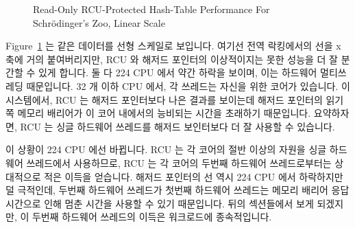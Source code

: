 \fi

\begin{figure}[tb]
\centering
{}
\caption{Read-Only RCU-Protected Hash-Table Performance For Schr\"odinger's Zoo, Linear Scale}
\label{fig:datastruct:Read-Only RCU-Protected Hash-Table Performance For Schroedinger's Zoo, Linear Scale}
\end{figure}

Figure~\ref{fig:datastruct:Read-Only RCU-Protected Hash-Table Performance For Schroedinger's Zoo, Linear Scale}
는 같은 데이터를 선형 스케일로 보입니다.
여기선 전역 락킹에서의 선을 x 축에 거의 붙여버리지만, RCU 와 해저드 포인터의
이상적이지는 못한 성능을 더 잘 분간할 수 있게 합니다.
둘 다 224 CPU 에서 약간 하락을 보이며, 이는 하드웨어 멀티쓰레딩 때문입니다.
32 개 이하 CPU 에서, 각 쓰레드는 자신을 위한 코어가 있습니다.
이 시스템에서, RCU 는 해저드 포인터보다 나은 결과를 보이는데 해저드 포인터의
읽기 쪽 메모리 배리어가 이 코어 내에서의 능비되는 시간을 초래하기 때문입니다.
요약하자면, RCU 는 싱글 하드웨어 쓰레드를 해저드 보인터보다 더 잘 사용할 수
있습니다.

이 상황이 224 CPU 에선 바뀝니다.
RCU 는 각 코어의 절반 이상의 자원을 싱글 하드웨어 쓰레드에서 사용하므로, RCU 는
각 코어의 두번째 하드웨어 쓰레드로부터는 상대적으로 적은 이득을 얻습니다.
해저드 포인터의 선 역시 224 CPU 에서 하락하지만 덜 극적인데, 두번째 하드웨어
쓰레드가 첫번째 하드웨어 쓰레드는 메모리 배리어 응답시간으로 인해 멈춘 시간을
사용할 수 있기 때문입니다.
뒤의 섹션들에서 보게 되겠지만, 이 두번째 하드웨어 쓰레드의 이득은 워크로드에
종속적입니다.

